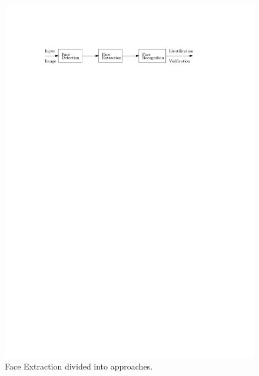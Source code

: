 \documentclass[Bachelorarbeit.tex]{subfiles}
\begin{document}
\begin{figure}[!h] %
\centering
\includegraphics[page=2,scale=1]{./pictures/drawings}
\caption{Face Extraction divided into approaches. \label{FEa}}
\end{figure}
\end{document}
